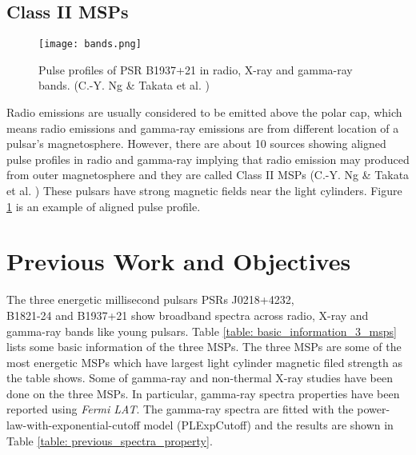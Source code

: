 \documentclass[12pt]{report}
\begin{document}
    \subsection{Class II MSPs}
      \begin{figure}[!htp]   
        \centering
        \texttt{[image: bands.png]}
        \caption{Pulse profiles of PSR B1937+21 in radio, X-ray and gamma-ray bands.
          \protect (C.-Y. Ng \& Takata et al. \cite{0004-637X-787-2-167})}
        \label{fig:class }
      \end{figure}	 
      Radio emissions are usually considered to be emitted above the polar cap, which means
      radio emissions and gamma-ray emissions are from different location of a pulsar's 
      magnetosphere. However, there are about 10 sources showing aligned pulse profiles in 
      radio and gamma-ray implying that radio emission may produced from outer 
      magnetosphere and they are called Class II MSPs (C.-Y. Ng \& Takata et al. 
      \cite{0004-637X-787-2-167}) These pulsars have strong magnetic fields near the light 
      cylinders. Figure \ref{fig:class } is an example of aligned pulse profile.

  
  \section{Previous Work and Objectives}
    The three energetic millisecond pulsars PSRs J0218+4232, \\ 
    B1821-24 and B1937+21 show broadband spectra across radio, X-ray and gamma-ray bands like 
    young pulsars. Table \ref{table: basic_information_3_msps} lists some basic information of 
    the three MSPs. The three MSPs are some of the most energetic MSPs which have largest light 
    cylinder magnetic filed strength as the table shows. Some of gamma-ray and 
    non-thermal X-ray studies have been done on the three MSPs. 
    In particular, gamma-ray spectra properties have been reported using \textit{Fermi LAT}.
    The gamma-ray spectra are fitted with the power-law-with-exponential-cutoff model 
    (PLExpCutoff) and the results are shown in Table \ref{table: previous_spectra_property}. 
\end{document}

